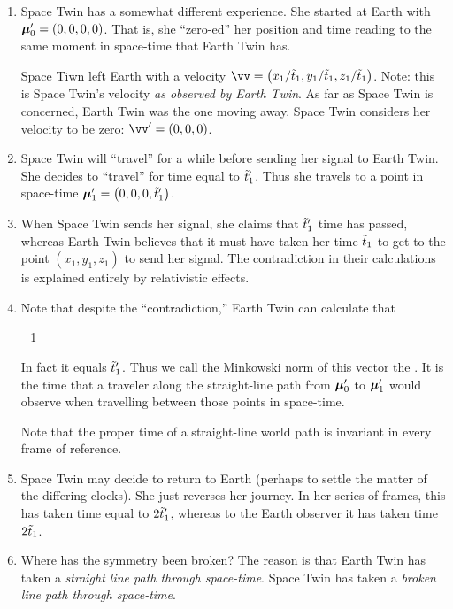 \begin{enumerate}
  \item Space Twin has a somewhat different experience. She started at
  Earth with $\bm{\mathrm{\mu}}'_0 = \mathopen{}\left( {0, 0, 0, 0} \right)\mathclose{}$. That is, she ``zero-ed''
  her position and time reading to the same moment in space-time that
  Earth Twin has.

  Space Tiwn left Earth with a velocity $\vv = \parens{x_1 / \ttilde_1,
  y_1 / \ttilde_1, z_1 / \ttilde_1}$. Note: this is Space Twin's
  velocity \emph{as observed by Earth Twin}. As far as Space Twin is
  concerned, Earth Twin was the one moving away. Space Twin considers
  her velocity to be zero: $\vv' = (0, 0, 0)$.

  \item Space Twin will ``travel'' for a while before sending her signal
  to Earth Twin. She decides to ``travel'' for time equal to
  $\tilde{t}'_1$. Thus she travels to a point in space-time $\bm{\mathrm{\mu}}_1' =
  \mathopen{}\left( {0, 0, 0, \tilde{t}'_1} \right)\mathclose{}$.

  \item When Space Twin sends her signal, she claims that $\tilde{t}'_1$
  time has passed, whereas Earth Twin believes that it must have taken
  her time $\tilde{t}_1$ to get to the point $(x_1, y_1, z_1)$ to send her
  signal. The contradiction in their calculations is explained entirely
  by relativistic effects.

  \item Note that despite the ``contradiction,'' Earth Twin can
  calculate that

  \begin{nedqn}
  \ltcol
    \ttilde_1
  \end{nedqn}

  In fact it equals $\tilde{t}'_1$. Thus we call the Minkowski norm of
  this vector the . It is the time that a traveler
  along the straight-line path from $\bm{\mathrm{\mu}}'_0$ to $\bm{\mathrm{\mu}}'_1$ would observe
  when travelling between those points in space-time.

  Note that the proper time of a straight-line world path is invariant
  in every frame of reference.

  \item Space Twin may decide to return to Earth (perhaps to settle the
  matter of the differing clocks). She just reverses her journey. In her
  series of frames, this has taken time equal to $2\tilde{t}'_1$, whereas
  to the Earth observer it has taken time $2\tilde{t}_1$.

  \item Where has the symmetry been broken? The reason is that Earth
  Twin has taken a \emph{straight line path through space-time}. Space
  Twin has taken a \emph{broken line path through space-time}.


\end{enumerate}
